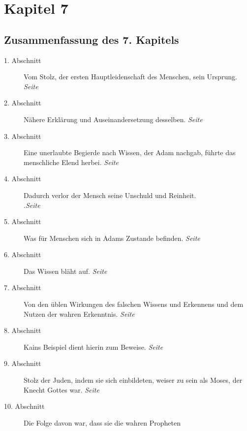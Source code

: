 

\chapter{Kapitel 7} \label{kap7}

\section{Zusammenfassung des 7. Kapitels}

\begin{description}
\item[1. Abschnitt] Vom Stolz, der ersten Hauptleidenschaft des Menschen, sein
Ursprung.
\dotfill \textit{Seite~\pageref{kap7_ab1}}\\
\item[2. Abschnitt] Nähere Erklärung und Auseinandersetzung desselben.
\dotfill \textit{Seite~\pageref{kap7_ab2}}\\
\item[3. Abschnitt] Eine unerlaubte Begierde nach Wissen, der Adam nachgab,
führte das menschliche Elend herbei.
\dotfill \textit{Seite~\pageref{kap7_ab3}}\\
\item[4. Abschnitt] Dadurch verlor der Mensch seine Unschuld und Reinheit.\\
.\dotfill \textit{Seite~\pageref{kap7_ab4}}\\
\item[5. Abschnitt] Was für Menschen sich in Adams Zustande befinden.
\dotfill \textit{Seite~\pageref{kap7_ab5}}\\
\item[6. Abschnitt] Das Wissen bläht auf.
\dotfill \textit{Seite~\pageref{kap7_ab6}}\\
\item[7. Abschnitt] Von den üblen Wirkungen des falschen Wissens und Erkennens
und dem Nutzen der wahren Erkenntnis.
\dotfill \textit{Seite~\pageref{kap7_ab7}}\\
\item[8. Abschnitt] Kains Beispiel dient hierin zum Beweise.
\dotfill \textit{Seite~\pageref{kap7_ab8}}\\
\item[9. Abschnitt] Stolz der Juden, indem sie sich einbildeten, weiser zu sein
als
Moses, der Knecht Gottes war.
\dotfill \textit{Seite~\pageref{kap7_ab9}}\\
\item[10. Abschnitt] Die Folge davon war, dass sie die wahren Propheten

\end{description}
